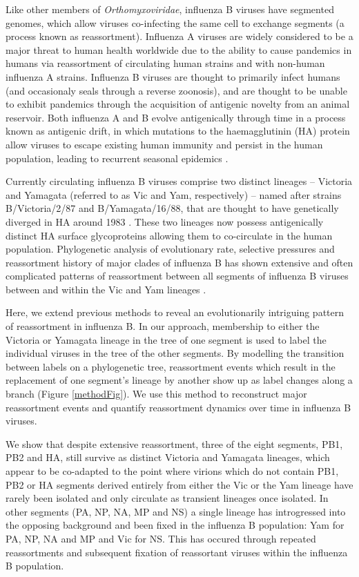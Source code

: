 \documentclass[11pt,oneside,letterpaper]{article}
\begin{document}
Like other members of \textit{Orthomyxoviridae}, influenza B viruses have segmented genomes, which allow viruses co-infecting the same cell to exchange segments (a process known as reassortment). 
Influenza A viruses are widely considered to be a major threat to human health worldwide due to the ability to cause pandemics in humans via reassortment of circulating human strains and with non-human influenza A strains. 
Influenza B viruses are thought to primarily infect humans (and occasionaly seals \cite{osterhaus2000,bodewes2013} through a reverse zoonosis), and are thought to be unable to exhibit pandemics through the acquisition of antigenic novelty from an animal reservoir. 
Both influenza A and B evolve antigenically through time in a process known as antigenic drift, in which mutations to the haemagglutinin (HA) protein allow viruses to escape existing human immunity and persist in the human population, leading to recurrent seasonal epidemics \cite{bedford2013}.

Currently circulating influenza B viruses comprise two distinct lineages -- Victoria and Yamagata (referred to as Vic and Yam, respectively) -- named after strains B/Victoria/2/87 and B/Yamagata/16/88, that are thought to have genetically diverged in HA around 1983 \cite{rota1990}. 
These two lineages now possess antigenically distinct HA surface glycoproteins \cite{kanegae1990,rota1990,nerome1998,nakagawa2002,ansaldi2003} allowing them to co-circulate in the human population.
Phylogenetic analysis of evolutionary rate, selective pressures and reassortment history of major clades of influenza B has shown extensive and often complicated patterns of reassortment between all segments of influenza B viruses between and within the Vic and Yam lineages \cite{chen2008}.

Here, we extend previous methods to reveal an evolutionarily intriguing pattern of reassortment in influenza B.
In our approach, membership to either the Victoria or Yamagata lineage in the tree of one segment is used to label the individual viruses in the tree of the other segments.
By modelling the transition between labels on a phylogenetic tree, reassortment events which result in the replacement of one segment's lineage by another show up as label changes along a branch (Figure \ref{methodFig}).
We use this method to reconstruct major reassortment events and quantify reassortment dynamics over time in influenza B viruses.

We show that despite extensive reassortment, three of the eight segments, PB1, PB2 and HA, still survive as distinct Victoria and Yamagata lineages, which appear to be co-adapted to the point where virions which do not contain PB1, PB2 or HA segments derived entirely from either the Vic or the Yam lineage have rarely been isolated and only circulate as transient lineages once isolated.
In other segments (PA, NP, NA, MP and NS) a single lineage has introgressed into the opposing background and been fixed in the influenza B population: Yam for PA, NP, NA and MP and Vic for NS.
This has occured through repeated reassortments and subsequent fixation of reassortant viruses within the influenza B population.
\end{document}
